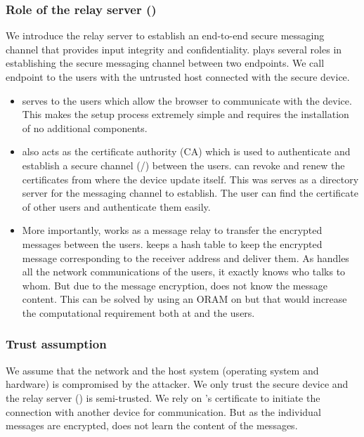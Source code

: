 \subsubsection{Role of the relay server (\relay)}

We introduce the relay server \relay to establish an end-to-end secure messaging channel that provides input integrity and confidentiality. \relay plays several roles in establishing the secure messaging channel between two endpoints. We call endpoint to the users with the untrusted host connected with the secure \usb device.

\begin{itemize}
  \item \relay serves \webusb \js to the users which allow the browser to communicate with the \usb device. This makes the setup process extremely simple and requires the installation of no additional components.
  \item \relay also acts as the certificate authority (CA) which is used to authenticate and establish a secure channel (\ssl/\tls) between the users. \relay can revoke and renew the certificates from where the \usb device update itself. This was \relay serves as a directory server for the messaging channel to establish. The user can find the certificate of other users and authenticate them easily. 
  \item More importantly, \relay works as a message relay to transfer the encrypted messages between the users. \relay keeps a hash table to keep the encrypted message corresponding to the receiver address and deliver them. As \relay handles all the network communications of the users, it exactly knows who talks to whom. But due to the message encryption, \relay does not know the message content. This can be solved by using an ORAM on \relay but that would increase the computational requirement both at \relay and the users.
\end{itemize} 

\subsubsection{Trust assumption}

We assume that the network and the host system (operating system and hardware) is compromised by the attacker. We only trust the \toolname secure \usb device and the relay server (\relay) is semi-trusted. We rely on \relay's certificate to initiate the connection with another device for communication. But as the individual messages are encrypted, \relay does not learn the content of the messages.


